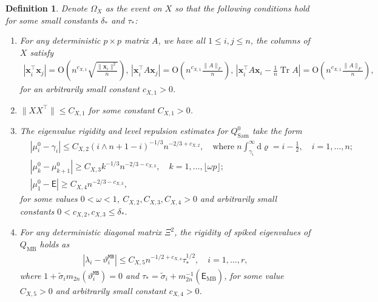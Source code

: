 \documentclass[12pt]{article}
\theoremstyle{plain}
\newtheorem{definition}{Definition}[section]
\numberwithin{equation}{section}
\begin{document}
\begin{definition}\label{def_OmegaX}
	Denote $\Omega_X$ as the event on $X$ so that the following conditions hold for some small constants $\delta_*$ and $\tau_*$:
	\begin{enumerate}
		\setlength{\itemsep}{0.3em}
		\setlength{\parsep}{0pt}
		\setlength{\topsep}{0.3em}
		\setlength{\labelsep}{0.6em}
		\item [(1)] For any deterministic $p\times p$ matrix $A$, we have all $1\leq i,j\leq n$, the columns of $X$ satisfy
		\begin{align*}
			|\mathbf{x}_i^\top \mathbf{x}_j|=\mathrm{O}\left(n^{c_{X,1}}\sqrt{\frac{\|\mathbf{x}_i\|^2}{n}}\right), \, |\mathbf{x}_i^\top A\mathbf{x}_j|=\mathrm{O}\left(n^{c_{X,1}}\frac{\|A\|_F}{n}\right),\,|\mathbf{x}_i^\top A\mathbf{x}_i-\frac{1}{n}\operatorname{Tr}A|=\mathrm{O}\left(n^{c_{X,1}}\frac{\|A\|_F}{n}\right),
		\end{align*}
		for an arbitrarily small constant $c_{X,1}>0$.
		\item [(2)] $\|XX^\top\|\leq C_{X,1}$ for some constant $C_{X,1}>0$.
		\item [(3)] The eigenvalue rigidity and level repulsion estimates for $Q_{\mathrm{Sam}}^0$ take the form
		\begin{align*}
			&|\mu^0_i-\gamma_i|\leq C_{X,2}(i\wedge n+1-i)^{-1/3}n^{-2/3+c_{X,2}},\quad \text{where}\; n\int_{\gamma_i}^{\infty}\mathrm{d}\varrho=i-\frac{1}{2},\quad i=1,\dots,n;\\
			&|\mu^0_k-\mu^0_{k+1}|\geq C_{X,3}k^{-1/3}n^{-2/3-c_{X,3}}, \quad k=1,\dots, \lfloor \omega p \rfloor;\\
			&|\mu^0_1-\mathsf{E}|\geq C_{X,4} n^{-2/3-c_{X,3}},
		\end{align*}
		for some values $0<\omega<1$, $C_{X,2},C_{X,3},C_{X,4}>0$ and arbitrarily small constants $0<c_{X,2},c_{X,3}\le\delta_*$.
		\item [(4)] For any deterministic diagonal matrix $\Xi^2$, the rigidity of spiked eigenvalues of $Q_{\mathrm{MB}}$ holds as 
		\begin{align*}
			|\lambda_i-\vartheta^{\mathtt{MB}}_i|\le C_{X,5}n^{-1/2+c_{X,4}}\tau_{*}^{1/2},\quad i=1,\dots,r,
		\end{align*}
		where $1+\widetilde{\sigma}_im_{2n}(\vartheta^{\mathtt{MB}}_i)=0$ and $\tau_{*}=\widetilde{\sigma}_i+m_{2n}^{-1}(\widehat{\mathsf{E}}_{\mathrm{MB}})$,
		for some value $C_{X,5}>0$ and arbitrarily small constant $c_{X,4}>0$.
	\end{enumerate}
\end{definition}
\end{document}
